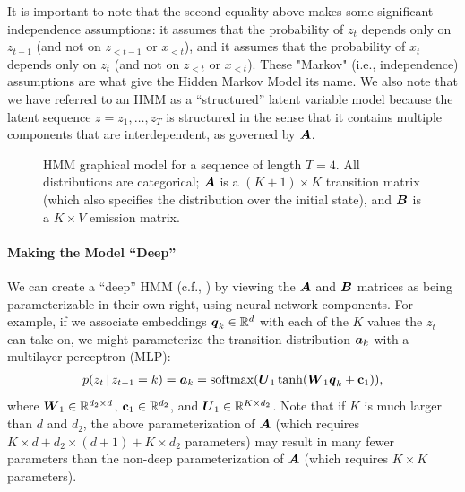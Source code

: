 \documentclass{article}
\begin{document}
It is important to note that the second equality above makes some significant independence assumptions: it assumes that the probability of $z_t$ depends only on $z_{t-1}$ (and not on $z_{<t-1}$ or $x_{<t}$), and it assumes that the probability of $x_t$ depends only on $z_t$ (and not on $z_{<t}$ or $x_{<t}$). These "Markov" (i.e., independence) assumptions are what give the Hidden Markov Model its name. We also note that we have referred to an HMM as a ``structured'' latent variable model because the latent sequence $z = z_1, \ldots, z_T$ is structured in the sense that it contains multiple components that are interdependent, as governed by $\boldsymbol{A}$.


\begin{figure}
\centering
{}
 \caption{HMM graphical model for a sequence of length $T=4$. All distributions are categorical; $\boldsymbol{A}$ is a $(K +1) \times K$ transition matrix (which also specifies the distribution over the initial state), and $\boldsymbol{B}$ is a $K \times V$ emission matrix.}
 \label{fig:hmm}
\end{figure}

\paragraph{Making the Model ``Deep''}
We can create a ``deep'' HMM (c.f., \citet{tran2016,Johnson2016}) by viewing the $\boldsymbol{A}$ and $\boldsymbol{B}$ matrices as being parameterizable in their own right, using neural network components. For example, if we associate embeddings $\boldsymbol{q}_k \in \mathbb{R}^d$ with each of the $K$ values the $z_t$ can take on, we might parameterize the transition distribution $\boldsymbol{a}_k$ with a multilayer perceptron (MLP):
\begin{align*}
p(z_t \,|\, z_{t-1} = k) = \boldsymbol{a}_k = \operatorname*{softmax}(\boldsymbol{U}_1 \tanh(\boldsymbol{W}_1 \boldsymbol{q}_k + \mathbf{c}_1)),
\end{align*}
where $\boldsymbol{W}_1 \in \mathbb{R}^{d_2 \times d}$, $\mathbf{c}_1 \in \mathbb{R}^{d_2}$, and $\boldsymbol{U}_1 \in \mathbb{R}^{K \times d_2 }$. Note that if $K$ is much larger than $d$ and $d_2$, the above parameterization of $\boldsymbol{A}$ (which requires $K \times d + d_2 \times (d+1) + K \times d_2$ parameters) may result in many fewer parameters than the non-deep parameterization of $\boldsymbol{A}$ (which requires $K \times K$ parameters).
\end{document}
